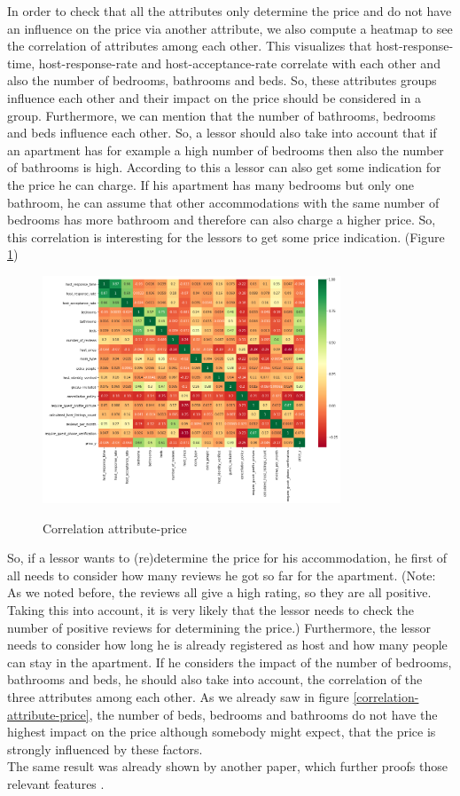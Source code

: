 \documentclass[journal]{IEEEtran}
\begin{document}
In order to check that all the attributes only determine the price and do not have an influence on the price via another attribute, we also compute a heatmap to see the correlation of attributes among each other. This visualizes that host-response-time, host-response-rate and host-acceptance-rate correlate with each other and also the number of bedrooms, bathrooms and beds. So, these attributes groups influence each other and their impact on the price should be considered in a group. Furthermore, we can mention that the number of bathrooms, bedrooms and beds influence each other. So, a lessor should also take into account that if an apartment has for example a high number of bedrooms then also the number of bathrooms is high. According to this a lessor can also get some indication for the price he can charge. If his apartment has many bedrooms but only one bathroom, he can assume that other accommodations with the same number of bedrooms has more bathroom and therefore can also charge a higher price. So, this correlation is interesting for the lessors to get some price indication. (Figure \ref{heatmap })
\begin{figure}
  \begin{center}
  \includegraphics[width=3.5in]{photo/8_heatmap.png}\\
  \caption{Correlation attribute-price}\label{heatmap }
  \end{center}
\end{figure}
So, if a lessor wants to (re)determine the price for his accommodation, he first of all needs to consider how many reviews he got so far for the apartment. (Note: As we noted before, the reviews all give a high rating, so they are all positive. Taking this into account, it is very likely that the lessor needs to check the number of positive reviews for determining the price.) Furthermore, the lessor needs to consider how long he is already registered as host and how many people can stay in the apartment. If he considers the impact of the number of bedrooms, bathrooms and beds, he should also take into account, the correlation of the three attributes among each other.
As we already saw in figure \ref{correlation-attribute-price}, the number of beds, bedrooms and bathrooms do not have the highest impact on the price although somebody might expect, that the price is strongly influenced by these factors. \\
The same result was already shown by another paper, which further proofs those relevant features \cite{RN1}. 
\end{document}
